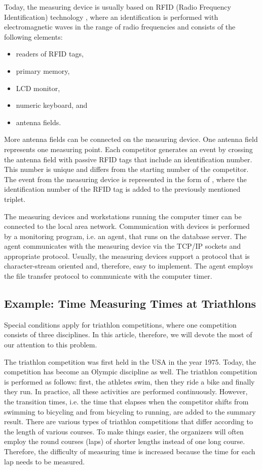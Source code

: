 \documentclass[preprint, prX]{revtex4}
\begin{document}
Today, the measuring device is usually based on RFID (Radio Frequency Identification) technology \cite{Finkenzeller:2010}, where an
identification is performed with electromagnetic waves in the range of radio frequencies and consists of the following elements:

\begin{itemize}
  \item readers of RFID tags,
  \item primary memory,
  \item LCD monitor,
  \item numeric keyboard, and
  \item antenna fields.
\end{itemize}

More antenna fields can be connected on the measuring device. One antenna field represents one measuring point. Each competitor
generates an event by crossing the antenna field with passive RFID tags that include an identification number. This number is unique and differs from the starting number of the competitor. The event from the measuring device is represented in the form of
, where the identification number of the RFID tag is added to the previously mentioned triplet.

The measuring devices and workstations running the computer timer can be connected to the local area network. Communication with devices is performed by a monitoring program, i.e. an agent, that runs on the database server. The agent communicates with the measuring device
via the TCP/IP sockets and appropriate protocol. Usually, the measuring devices support a protocol  that is character-stream
oriented and, therefore, easy to implement. The agent employs the file transfer protocol to communicate with the computer timer.

\subsection{Example: Time Measuring Times at Triathlons}

Special conditions apply for triathlon competitions, where one competition consists of three disciplines. In this article,
therefore, we will devote the most of our attention to this problem.

The triathlon competition was first held in the USA in the year 1975. Today, the competition has become an Olympic discipline as well.
The triathlon competition is performed as follows: first, the athletes swim, then they ride a bike and finally they run. In practice,
all these activities are performed continuously. However, the transition times, i.e. the time that elapses when the competitor shifts
from swimming to bicycling and from bicycling to running, are added to the summary result. There are various types of triathlon
competitions that differ according to the length of various courses. To make things easier, the organizers will often employ the round
courses (laps) of shorter lengths instead of one long course. Therefore, the difficulty of measuring time is increased because the time
for each lap needs to be measured.
\end{document}
